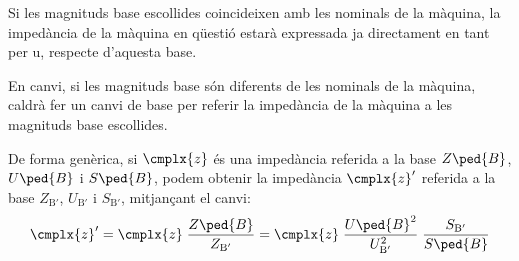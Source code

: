 Si les magnituds base escollides coincideixen amb les nominals de la màquina,
la impedància de la màquina en qüestió estarà expressada ja directament en tant per u, respecte d'aquesta base.

 En canvi, si les magnituds base són diferents de les nominals de la màquina, caldrà fer un canvi de base per referir la impedància de la màquina a les magnituds base escollides.

De forma genèrica, si $\cmplx{z}$ és una impedància referida a la base $Z\ped{B}$, $U\ped{B}$ i $S\ped{B}$, podem obtenir la impedància $\cmplx{z}'$ referida a la base $Z_{\text{B}'}$, $U_{\text{B}'}$ i $S_{\text{B}'}$, mitjançant el canvi:
\begin{equation}
   \cmplx{z}' = \cmplx{z} \; \frac{Z\ped{B}}{Z_{\text{B}'}} = \cmplx{z} \; \frac{U\ped{B}^2}{U_{\text{B}'}^2} \; \frac{S_{\text{B}'}}{S\ped{B}}\label{eq_pu_canvi_base}
\end{equation}



